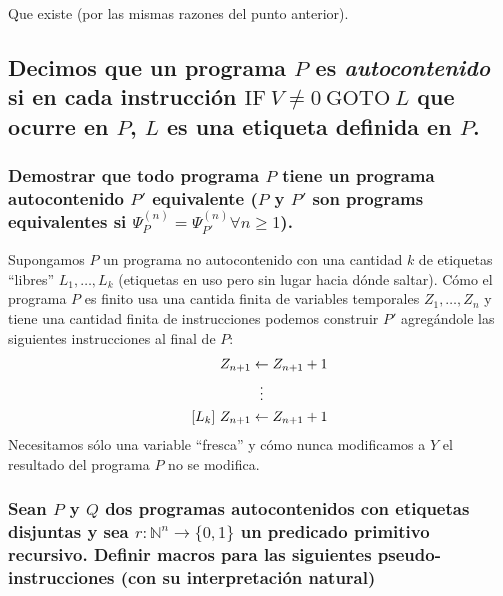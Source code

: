 \documentclass[fleqn, 11pt]{article}
\newcommand{\nat}{\mathbb{N}}
\newcommand{\into}{\leftarrow}
\newcommand{\IF}{\text{IF}}
\newcommand{\GOTO}{\text{GOTO}}
\begin{document}
Que existe (por las mismas razones del punto anterior).

\subsection{Decimos que un programa $P$ es \emph{autocontenido} si en cada
instrucción $\IF\ V \neq 0\ \GOTO\ L$ que ocurre en $P$, $L$ es una etiqueta
definida en $P$.}

\subsubsection{Demostrar que todo programa $P$ tiene un programa autocontenido
$P'$ equivalente ($P$ y $P'$ son programs equivalentes si
$\Psi^{(n)}_P = \Psi^{(n)}_{P'} \forall n \geq 1$).}

Supongamos $P$ un programa no autocontenido con una cantidad $k$ de etiquetas
``libres'' $L_1, \dots, L_k$ (etiquetas en uso pero sin lugar hacia dónde
saltar). Cómo el programa $P$ es finito usa una cantida finita de variables
temporales $Z_1, \dots, Z_n$ y tiene una cantidad finita de instrucciones
podemos construir $P'$ agregándole las siguientes instrucciones al final de
$P$:
\begin{align*}
	[L_1]\ &Z_{n+1} \into Z_{n+1} + 1 \\
	       & \hspace{2.7em} \vdots \\
	[L_k]\ &Z_{n+1} \into Z_{n+1} + 1
\end{align*}
Necesitamos sólo una variable ``fresca'' y cómo nunca modificamos a $Y$ el
resultado del programa $P$ no se modifica.

\subsubsection{Sean $P$ y $Q$ dos programas autocontenidos con etiquetas
disjuntas y sea $r : \nat^n \to \{0, 1\}$ un predicado primitivo recursivo.
Definir macros para las siguientes pseudo-instrucciones (con su interpretación
natural)}
\end{document}
